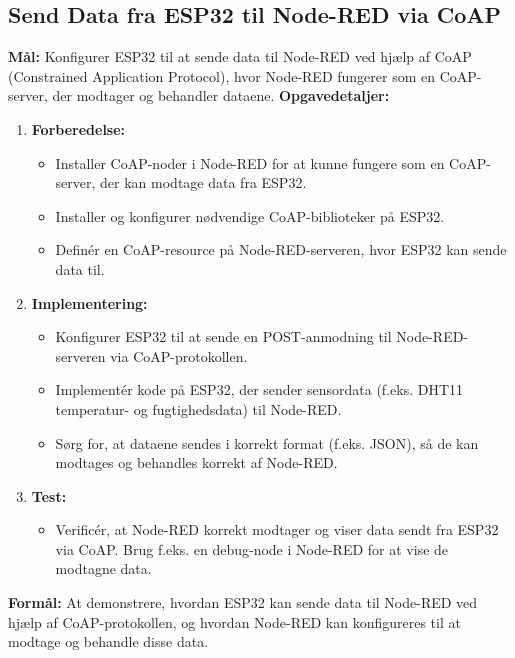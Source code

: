 \subsection*{Send Data fra ESP32 til Node-RED via CoAP}
\textbf{Mål:} Konfigurer ESP32 til at sende data til Node-RED ved hjælp af CoAP (Constrained Application Protocol), hvor Node-RED fungerer som en CoAP-server, der modtager og behandler dataene.
\newline\newline\noindent
\textbf{Opgavedetaljer:}
\begin{enumerate}
	\item \textbf{Forberedelse:}
	\begin{itemize}
		\item Installer CoAP-noder i Node-RED for at kunne fungere som en CoAP-server, der kan modtage data fra ESP32.
		\item Installer og konfigurer nødvendige CoAP-biblioteker på ESP32.
		\item Definér en CoAP-resource på Node-RED-serveren, hvor ESP32 kan sende data til.
	\end{itemize}
	\item \textbf{Implementering:}
	\begin{itemize}
		\item Konfigurer ESP32 til at sende en POST-anmodning til Node-RED-serveren via CoAP-protokollen.
		\item Implementér kode på ESP32, der sender sensordata (f.eks. DHT11 temperatur- og fugtighedsdata) til Node-RED.
		\item Sørg for, at dataene sendes i korrekt format (f.eks. JSON), så de kan modtages og behandles korrekt af Node-RED.
	\end{itemize}
	\item \textbf{Test:}
	\begin{itemize}
		\item Verificér, at Node-RED korrekt modtager og viser data sendt fra ESP32 via CoAP. Brug f.eks. en debug-node i Node-RED for at vise de modtagne data.
	\end{itemize}
\end{enumerate}
\textbf{Formål:} At demonstrere, hvordan ESP32 kan sende data til Node-RED ved hjælp af CoAP-protokollen, og hvordan Node-RED kan konfigureres til at modtage og behandle disse data.

